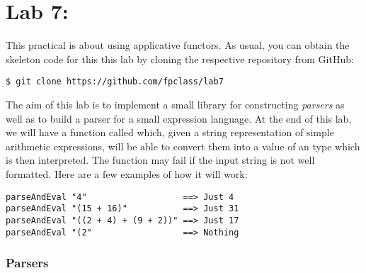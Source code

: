 \section{Lab 7: \practicalSixBTitle}

This practical is about using applicative functors. As usual, you can obtain the skeleton code for this this lab by cloning the respective repository from GitHub:
\begin{verbatim}
$ git clone https://github.com/fpclass/lab7
\end{verbatim}
The aim of this lab is to implement a small library for constructing \emph{parsers} as well as to build a parser for a small expression language. At the end of this lab, we will have a function called  which, given a string representation of simple arithmetic expressions, will be able to convert them into a value of an  type which is then interpreted. The  function may fail if the input string is not well formatted. Here are a few examples of how it will work:
\begin{verbatim}
parseAndEval "4"                   ==> Just 4
parseAndEval "(15 + 16)"           ==> Just 31
parseAndEval "((2 + 4) + (9 + 2))" ==> Just 17
parseAndEval "(2"                  ==> Nothing
\end{verbatim}

\subsubsection{Parsers}

